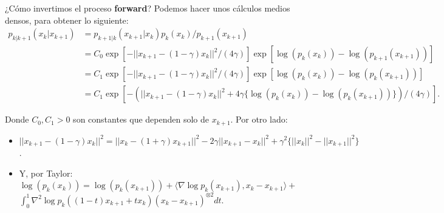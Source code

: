 \documentclass[aspectratio=169,xcolor=dvipsnames, t, spanish]{beamer}
\begin{document}
    \begin{frame}{¿Cómo invertimos el proceso \textbf{forward}?}
    Podemos hacer unos cálculos medios densos, para obtener lo siguiente:
        \begin{align*}
            p_{k|k+1}(x_{k}|x_{k+1}) &= p_{k+1|k}(x_{k+1}|x_{k})p_{k}(x_{k})/p_{k+1}(x_{k+1}) \\
            &= C_{0}\exp[-||x_{k+1}-(1-\gamma)x_{k}||^{2}/(4\gamma)]\exp[\log(p_{k}(x_{k}))-\log(p_{k+1}(x_{k+1}))] \\
            &= C_{1}\exp[-||x_{k+1}-(1-\gamma)x_{k}||^{2}/(4\gamma)]\exp[\log(p_{k}(x_{k}))-\log(p_{k}(x_{k+1}))] \\
            &= C_{1}\exp[-(||x_{k+1}-(1-\gamma)x_{k}||^{2}+4\gamma\{\log(p_{k}(x_{k}))-\log(p_{k}(x_{k+1}))\})/(4\gamma)] .
        \end{align*}\vspace{-3mm}
        
        \pause Donde $C_{0}, C_{1} > 0$ son constantes que dependen solo de $x_{k+1}$. Por otro lado:
        \begin{itemize}
            \item $||x_{k+1}-(1-\gamma)x_{k}||^{2} = ||x_{k}-(1+\gamma)x_{k+1}||^{2}-2\gamma||x_{k+1}-x_{k}||^{2}+\gamma^{2}\{||x_{k}||^{2}-||x_{k+1}||^{2}\}$.
            \item Y, por Taylor: $\log(p_{k}(x_{k}))=\log(p_{k}(x_{k+1}))+\langle\nabla \log p_{k}(x_{k+1}),x_{k}-x_{k+1}\rangle+$ \\ $\int_{0}^{1}\nabla^{2}\log p_{k}((1-t)x_{k+1}+tx_{k})(x_{k}-x_{k+1})^{\otimes2}dt.$
        \end{itemize}
    \end{frame}
    
\end{document}
